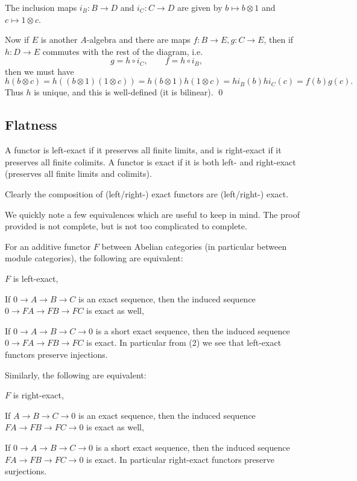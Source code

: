     The inclusion maps $i_B\colon B\to D$ and $i_C\colon C\to D$ are given by $b\mapsto b\otimes1$ and $c\mapsto1\otimes c$.

    Now if $E$ is another $A$-algebra and there are maps $f\colon B\to E,g\colon C\to E$, then if $h\colon D\to E$ commutes with the
    rest of the diagram, i.e.
    $$ g = h\circ i_C,\qquad f = h\circ i_B, $$
    then we must have
    $$ h(b\otimes c) = h((b\otimes1)(1\otimes c)) = h(b\otimes1)h(1\otimes c) = hi_B(b)hi_C(c) = f(b)g(c) . $$
    Thus $h$ is unique, and this is well-defined (it is bilinear).
    \qed

\eproof

\subsection{Flatness}

\bdefn

    A functor is {\emphcolor left-exact} if it preserves all finite limits, and is {\emphcolor right-exact} if it preserves all finite colimits.
    A functor is {\emphcolor exact} if it is both left- and right-exact (preserves all finite limits and colimits).

\edefn

Clearly the composition of (left/right-) exact functors are (left/right-) exact.

We quickly note a few equivalences which are useful to keep in mind.
The proof provided is not complete, but is not too complicated to complete.

\bprop

    For an additive functor $F$ between Abelian categories (in particular between module categories), the following are equivalent:
    \benum
        \item $F$ is left-exact,
        \item If $0\to A\to B\to C$ is an exact sequence, then the induced sequence $0\to FA\to FB\to FC$ is exact as well,
        \item If $0\to A\to B\to C\to0$ is a short exact sequence, then the induced sequence $0\to FA\to FB\to FC$ is exact.
    \eenum
    In particular from (2) we see that left-exact functors preserve injections.

    Similarly, the following are equivalent:
    \benum
        \item $F$ is right-exact,
        \item If $A\to B\to C\to0$ is an exact sequence, then the induced sequence $FA\to FB\to FC\to0$ is exact as well,
        \item If $0\to A\to B\to C\to0$ is a short exact sequence, then the induced sequence $FA\to FB\to FC\to0$ is exact.
    \eenum
    In particular right-exact functors preserve surjections.

